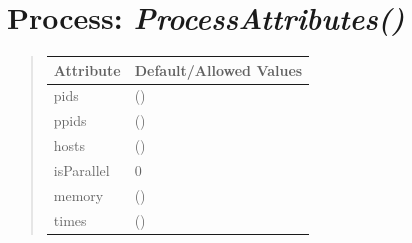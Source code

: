 \documentclass[letterpaper,10pt,english]{sphinxmanual}
\begin{document}
\section{\textbf{Process}: \emph{ProcessAttributes()}}
\label{attributes:process-processattributes}
\begin{DUlineblock}{0em}
\item[] 
\end{DUlineblock}
\begin{quote}

\begin{tabulary}{\linewidth}{|L|L|}
\hline

\textbf{Attribute}
 & 
\textbf{Default/Allowed Values}
\\
\hline
pids
 & 
()
\\
\hline
ppids
 & 
()
\\
\hline
hosts
 & 
()
\\
\hline
isParallel
 & 
0
\\
\hline
memory
 & 
()
\\
\hline
times
 & 
()
\\
\hline\end{tabulary}

\end{quote}

\begin{DUlineblock}{0em}
\item[] 
\end{DUlineblock}

\begin{DUlineblock}{0em}
\item[] 
\end{DUlineblock}
\end{document}
